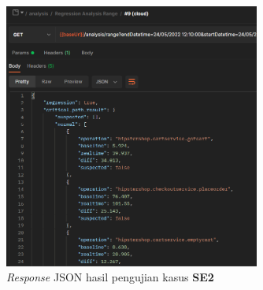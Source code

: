 
\begin{figure}[!htb]
	\centering
	\includegraphics[width=0.75\textwidth]{resources/ch4/json/9.png}
	\caption{\textit{Response} JSON hasil pengujian kasus \textbf{SE2}}
	\label{result_json_9}
\end{figure}


